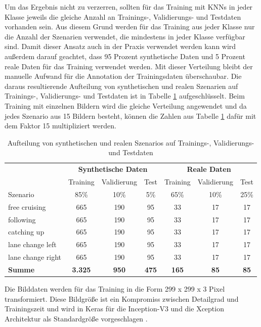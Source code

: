 Um das Ergebnis nicht zu verzerren, sollten für das Training mit \acp{KNN} in jeder Klasse jeweils die gleiche Anzahl an Trainings-, Validierungs- und Testdaten vorhanden sein. Aus diesem Grund werden für das Training aus jeder Klasse nur die Anzahl der Szenarien verwendet, die mindestens in jeder Klasse verfügbar sind. Damit dieser Ansatz auch in der Praxis verwendet werden kann wird außerdem darauf geachtet, dass 95 Prozent synthetische Daten und 5 Prozent reale Daten für das Training verwendet werden. Mit dieser Verteilung bleibt der manuelle Aufwand für die Annotation der Trainingsdaten überschaubar. Die daraus resultierende Aufteilung von synthetischen und realen Szenarien auf Trainings-, Validierungs- und Testdaten ist in Tabelle \ref{tab_daten_aufteilung} aufgeschlüsselt. Beim Training mit einzelnen Bildern wird die gleiche Verteilung angewendet und da jedes Szenario aus 15 Bildern besteht, können die Zahlen aus Tabelle \ref{tab_daten_aufteilung} dafür mit dem Faktor 15 multipliziert werden.

\begin{table}[h]
\centering
\def\arraystretch{1.4}
\begin{tabular}{l c c c c c c}

& \multicolumn{3}{c}{\textbf{Synthetische Daten}} & \multicolumn{3}{c}{\textbf{\textbf{Reale Daten}}} \\
& Training & Validierung & Test & Training & Validierung & Test \\
Szenario & 85\% & 10\% & 5\% & 65\% & 10\% & 25\% \\
\hline
free cruising & 665 & 190 & 95 & 33 & 17 & 17 \\
following & 665 & 190 & 95 & 33 & 17 & 17 \\
catching up & 665 & 190 & 95 & 33 & 17 & 17 \\
lane change left & 665 & 190 & 95 & 33 & 17 & 17 \\
lane change right & 665 & 190 & 95 & 33 & 17 & 17 \\
\hline
\textbf{Summe} & \textbf{3.325} & \textbf{950} & \textbf{475} & \textbf{165} & \textbf{85} & \textbf{85} \\
\hline

\end{tabular}
\caption{Aufteilung von synthetischen und realen Szenarios auf Trainings-, Validierungs- und Testdaten}
\label{tab_daten_aufteilung}
\end{table}

Die Bilddaten werden für das Training in die Form 299 x 299 x 3 Pixel transformiert. Diese Bildgröße ist ein Kompromiss zwischen Detailgrad und Trainingszeit und wird in Keras für die Inception-V3 und die Xception Architektur als Standardgröße vorgeschlagen \cite{chollet2015keras}.

